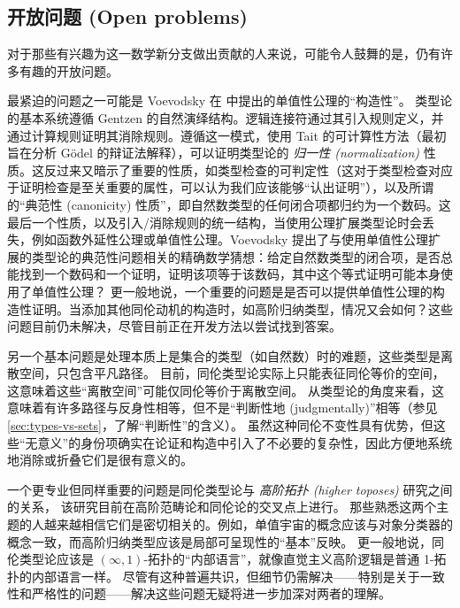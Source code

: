 %

\subsection*{开放问题 (Open problems)}

%

对于那些有兴趣为这一数学新分支做出贡献的人来说，可能令人鼓舞的是，仍有许多有趣的开放问题。

最紧迫的问题之一可能是 Voevodsky 在 \cite{Universe-poly} 中提出的单值性公理的“构造性”。
类型论的基本系统遵循 Gentzen 的自然演绎结构。逻辑连接符通过其引入规则定义，并通过计算规则证明其消除规则。遵循这一模式，使用 Tait 的可计算性方法（最初旨在分析 G\"odel 的辩证法解释），可以证明类型论的 \emph{归一性 (normalization)} 性质。这反过来又暗示了重要的性质，如类型检查的可判定性（这对于类型检查对应于证明检查是至关重要的属性，可以认为我们应该能够“认出证明”），以及所谓的“典范性 (canonicity) 性质”，即自然数类型的任何闭合项都归约为一个数码。这最后一个性质，以及引入/消除规则的统一结构，当使用公理扩展类型论时会丢失，例如函数外延性公理或单值性公理。Voevodsky 提出了与使用单值性公理扩展的类型论的典范性问题相关的精确数学猜想：给定自然数类型的闭合项，是否总能找到一个数码和一个证明，证明该项等于该数码，其中这个等式证明可能本身使用了单值性公理？
更一般地说，一个重要的问题是是否可以提供单值性公理的构造性证明。当添加其他同伦动机的构造时，如高阶归纳类型，情况又会如何？这些问题目前仍未解决，尽管目前正在开发方法以尝试找到答案。

另一个基本问题是处理本质上是集合的类型（如自然数）时的难题，这些类型是离散空间，只包含平凡路径。
目前，同伦类型论实际上只能表征同伦等价的空间，这意味着这些“离散空间”可能仅同伦等价于离散空间。
从类型论的角度来看，这意味着有许多路径与反身性相等，但不是“判断性地 (judgmentally)”相等（参见 \cref{sec:types-vs-sets}，了解“判断性”的含义）。
虽然这种同伦不变性具有优势，但这些“无意义”的身份项确实在论证和构造中引入了不必要的复杂性，因此方便地系统地消除或折叠它们是很有意义的。

一个更专业但同样重要的问题是同伦类型论与 \emph{高阶拓扑 (higher toposes)} 研究之间的关系，
该研究目前在高阶范畴论和同伦论的交叉点上进行。
那些熟悉这两个主题的人越来越相信它们是密切相关的。例如，单值宇宙的概念应该与对象分类器的概念一致，而高阶归纳类型应该是局部可呈现性的“基本”反映。
更一般地说，同伦类型论应该是 $(\infty,1)$-拓扑的“内部语言”，就像直觉主义高阶逻辑是普通 1-拓扑的内部语言一样。
尽管有这种普遍共识，但细节仍需解决——特别是关于一致性和严格性的问题——解决这些问题无疑将进一步加深对两者的理解。

